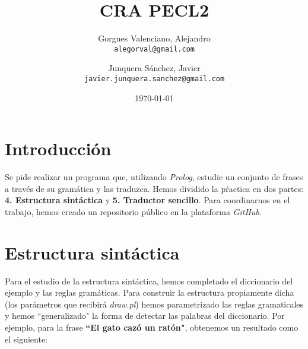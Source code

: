 \documentclass[a4paper]{article}
\title{CRA PECL2}
\author{Gorgues Valenciano, Alejandro\\
        \texttt{alegorval@gmail.com}
        \and
        Junquera Sánchez, Javier\\
        \texttt{javier.junquera.sanchez@gmail.com}}
\date{\today}
\begin{document}
    \maketitle


    \section*{Introducción}

    Se pide realizar un programa que, utilizando \emph{Prolog}, estudie un conjunto de frases a través de su gramática y las traduzca. Hemos dividido la pŕactica en dos partes: \textbf{4. Estructura sintáctica} y \textbf{5. Traductor sencillo}. Para coordinarnos en el trabajo, hemos creado un repositorio público en la plataforma \emph{GitHub}\cite{REPO}.

    \section*{Estructura sintáctica}

    Para el estudio de la estructura sintáctica, hemos completado el diccionario del ejemplo y las reglas gramáticas. Para construir la estructura propiamente dicha (los parámetros que recibirá \emph{draw.pl}) hemos parametrizado las reglas gramaticales y hemos ``generalizado" la forma de detectar las palabras del diccionario. Por ejemplo, para la frase \textbf{``El gato cazó un ratón"}, obtenemos un resultado como el siguiente:\\

\end{document}
